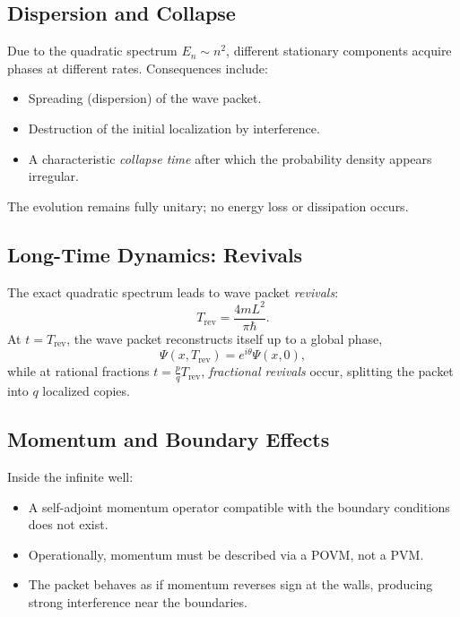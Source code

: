 \subsection{Dispersion and Collapse}

Due to the quadratic spectrum $E_n \sim n^2$, different stationary components acquire phases at different rates.  
Consequences include:
\begin{itemize}
    \item Spreading (dispersion) of the wave packet.
    \item Destruction of the initial localization by interference.
    \item A characteristic \emph{collapse time} after which the probability density appears irregular.
\end{itemize}
The evolution remains fully unitary; no energy loss or dissipation occurs.

\subsection{Long-Time Dynamics: Revivals}

The exact quadratic spectrum leads to wave packet \emph{revivals}:
\begin{equation}
T_{\mathrm{rev}} = \frac{4 m L^2}{\pi \hbar}.
\end{equation}
At $t = T_{\mathrm{rev}}$, the wave packet reconstructs itself up to a global phase,
\begin{equation}
\Psi(x,T_{\mathrm{rev}}) = e^{i \theta} \Psi(x,0),
\end{equation}
while at rational fractions $t = \frac{p}{q} T_{\mathrm{rev}}$, \emph{fractional revivals} occur, splitting the packet into $q$ localized copies.

\subsection{Momentum and Boundary Effects}

Inside the infinite well:
\begin{itemize}
    \item A self-adjoint momentum operator compatible with the boundary conditions does not exist.
    \item Operationally, momentum must be described via a POVM, not a PVM.
    \item The packet behaves as if momentum reverses sign at the walls, producing strong interference near the boundaries.
\end{itemize}

